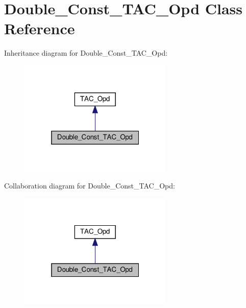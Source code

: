 \hypertarget{classDouble__Const__TAC__Opd}{}\section{Double\+\_\+\+Const\+\_\+\+T\+A\+C\+\_\+\+Opd Class Reference}
\label{classDouble__Const__TAC__Opd}


Inheritance diagram for Double\+\_\+\+Const\+\_\+\+T\+A\+C\+\_\+\+Opd\+:
\nopagebreak
\begin{figure}[H]
\begin{center}
\leavevmode
\includegraphics[width=208pt]{classDouble__Const__TAC__Opd__inherit__graph}
\end{center}
\end{figure}


Collaboration diagram for Double\+\_\+\+Const\+\_\+\+T\+A\+C\+\_\+\+Opd\+:
\nopagebreak
\begin{figure}[H]
\begin{center}
\leavevmode
\includegraphics[width=208pt]{classDouble__Const__TAC__Opd__coll__graph}
\end{center}
\end{figure}
